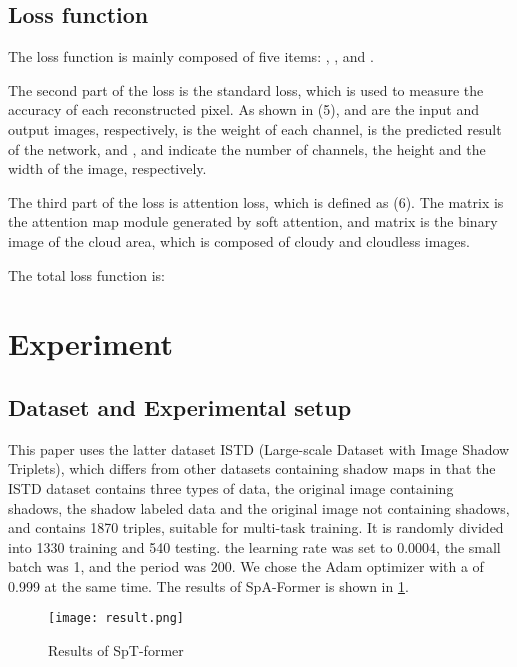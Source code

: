 \documentclass[journal]{IEEEtran}
\begin{document}
\subsection{Loss function}

The loss function is mainly composed of five items: , , and .


The second part of the loss is the standard  loss, which is used to measure the accuracy of each reconstructed pixel. As shown in (5),  and  are the input and output images, respectively,  is the weight of each channel,  is the predicted result of the network, and ,  and  indicate the number of channels, the height and the width of the image, respectively.

The third part of the loss is attention loss, which is defined as (6). The matrix  is the attention map module generated by soft attention, and matrix  is the binary image of the cloud area, which is composed of cloudy and cloudless images.


The total loss function is:



\section{Experiment}
\subsection{Dataset and Experimental setup }
This paper uses the latter dataset ISTD \cite{2} (Large-scale Dataset with Image Shadow Triplets), which differs from other datasets containing shadow maps in that the ISTD dataset contains three types of data, the original image containing shadows, the shadow labeled data and the original image not containing shadows, and contains 1870 triples, suitable for multi-task training. It is randomly divided into 1330 training and 540 testing. the learning rate was set to 0.0004, the small batch was 1, and the period was 200. We chose the Adam optimizer with a  of 0.999 at the same time. The results of SpA-Former is shown in \ref{result}.


\begin{figure}[h]
\centering
\texttt{[image: result.png]}
\caption{Results of SpT-former}
\label{result}
\end{figure}
\end{document}

